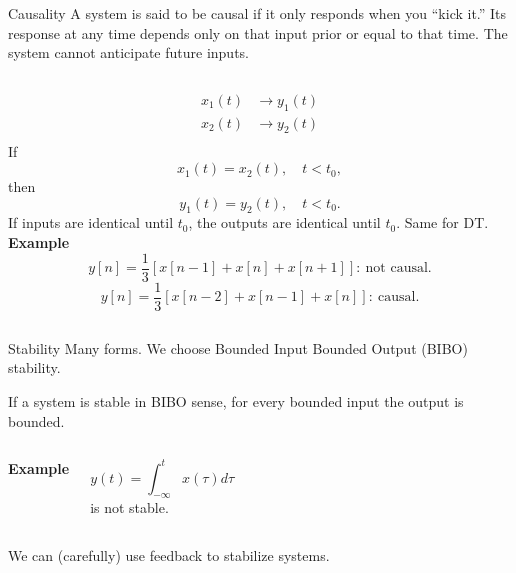 \begin{frame}{Causality}
    A system is said to be causal if it only responds when you ``kick it.'' Its response at any time depends only on that input prior or equal to that time. The system cannot anticipate future inputs.

    \begin{columns}
            \begin{align*}
              x_1(t) &\rightarrow y_1(t) \\
              x_2(t) &\rightarrow y_2(t) \\
            \end{align*}
            If
            \begin{equation*}
                x_1(t) = x_2(t) , \quad t < t_0,
            \end{equation*}
            then
            \begin{equation*}
                y_1(t) = y_2(t) , \quad t < t_0.
            \end{equation*}
            If inputs are identical until $t_0$, the outputs are identical until $t_0$. Same for DT.
        \noindent\textbf{ Example}
        \begin{equation*}
            y[n] = \frac{1}{3}\left[x[n-1]+x[n] + x[n+1]\right]:\:\text{not causal.}
        \end{equation*}
        \begin{equation*}
            y[n] = \frac{1}{3}\left[x[n-2]+x[n-1] + x[n]\right]:\:\text{causal.}
        \end{equation*}        
    \end{columns}
\end{frame}

\begin{frame}{Stability}
    Many forms. We choose Bounded Input Bounded Output (BIBO) stability.\par
    If a system is stable in BIBO sense, for every bounded input the output is bounded.
    {
        \begin{columns}
            \noindent\textbf{ Example}\par
            \begin{equation*}
                y(t) = \int_{-\infty}^{t}x(\tau)d\tau
            \end{equation*}
            is not stable.
        \end{columns}
    }
    \pause
    We can (carefully) use feedback to stabilize systems. 
\end{frame}

